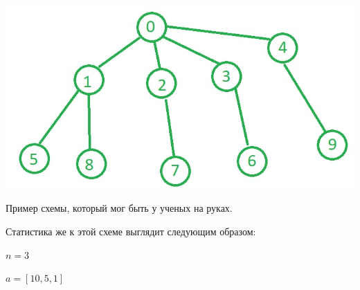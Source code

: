 \includegraphics{example000.jpg}

Пример схемы, который мог быть у ученых на руках. 

Статистика же к этой схеме выглядит следующим образом:

$n = 3$

$a = [10, 5, 1]$